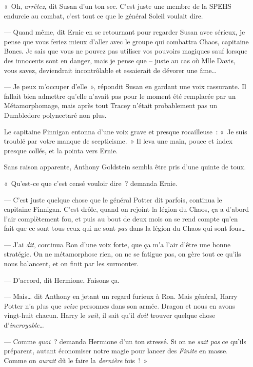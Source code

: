 «~Oh, \emph{arrêtez}, dit Susan d'un ton sec. C'est juste une membre de la SPEHS endurcie au combat, c'est tout ce que le général Soleil voulait dire.

--- Quand même, dit Ernie en se retournant pour regarder Susan avec sérieux, je pense que vous feriez mieux d'aller avec le groupe qui combattra Chaos, capitaine Bones. Je sais que vous ne pouvez pas utiliser vos pouvoirs magiques sauf lorsque des innocents sont en danger, mais je pense que -- juste au cas où Mlle Davis, vous savez, deviendrait incontrôlable et essaierait de dévorer une âme…

--- Je peux m'occuper d'elle~», répondit Susan en gardant une voix rassurante. Il fallait bien admettre qu'elle n'avait pas pour le moment été remplacée par un Métamorphomage, mais après tout Tracey n'était probablement pas un Dumbledore polynectaré non plus.

Le capitaine Finnigan entonna d'une voix grave et presque rocailleuse~: «~Je suis troublé par votre manque de scepticisme.~» Il leva une main, pouce et index presque collés, et la pointa vers Ernie.

Sans raison apparente, Anthony Goldstein sembla être pris d'une quinte de toux.

«~Qu'est-ce que c'est censé vouloir dire~? demanda Ernie.

--- C'est juste quelque chose que le général Potter dit parfois, continua le capitaine Finnigan. C'est drôle, quand on rejoint la légion du Chaos, ça a d'abord l'air complètement fou, et puis au bout de deux mois on se rend compte qu'en fait que ce sont tous ceux qui ne sont \emph{pas} dans la légion du Chaos qui sont fous…

--- J'ai \emph{dit}, continua Ron d'une voix forte, que ça m'a l'air d'être une bonne stratégie. On ne métamorphose rien, on ne se fatigue pas, on gère tout ce qu'ils nous balancent, et on finit par les surmonter.

--- D'accord, dit Hermione. Faisons ça.

--- Mais… dit Anthony en jetant un regard furieux à Ron. Mais général, Harry Potter n'a plus que \emph{seize} personnes dans son armée. Dragon et nous en avons vingt-huit chacun. Harry le \emph{sait}, il sait qu'il \emph{doit} trouver quelque chose d'\emph{incroyable}…

--- Comme \emph{quoi}~? demanda Hermione d'un ton stressé. Si on ne \emph{sait pas} ce qu'ils préparent, autant économiser notre magie pour lancer des \emph{Finite} en masse. Comme on \emph{aurait} dû le faire la \emph{dernière} fois~!~»

